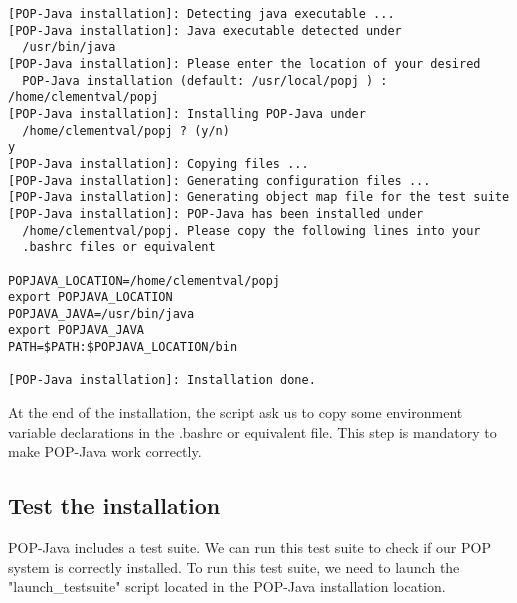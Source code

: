 \begin{lstlisting}
[POP-Java installation]: Detecting java executable ...
[POP-Java installation]: Java executable detected under 
  /usr/bin/java
[POP-Java installation]: Please enter the location of your desired 
  POP-Java installation (default: /usr/local/popj ) : 
/home/clementval/popj
[POP-Java installation]: Installing POP-Java under 
  /home/clementval/popj ? (y/n)
y
[POP-Java installation]: Copying files ...
[POP-Java installation]: Generating configuration files ...
[POP-Java installation]: Generating object map file for the test suite
[POP-Java installation]: POP-Java has been installed under 
  /home/clementval/popj. Please copy the following lines into your 
  .bashrc files or equivalent

POPJAVA_LOCATION=/home/clementval/popj
export POPJAVA_LOCATION
POPJAVA_JAVA=/usr/bin/java
export POPJAVA_JAVA
PATH=$PATH:$POPJAVA_LOCATION/bin

[POP-Java installation]: Installation done.
\end{lstlisting}

At the end of the installation, the script ask us to copy some environment variable declarations in the .bashrc or equivalent file.
This step is mandatory to make POP-Java work correctly.

\subsection{Test the installation}
POP-Java includes a test suite. We can run this test suite to check if our POP system is correctly installed.
To run this test suite, we need to launch the "launch\_testsuite" script located in the POP-Java installation location.

